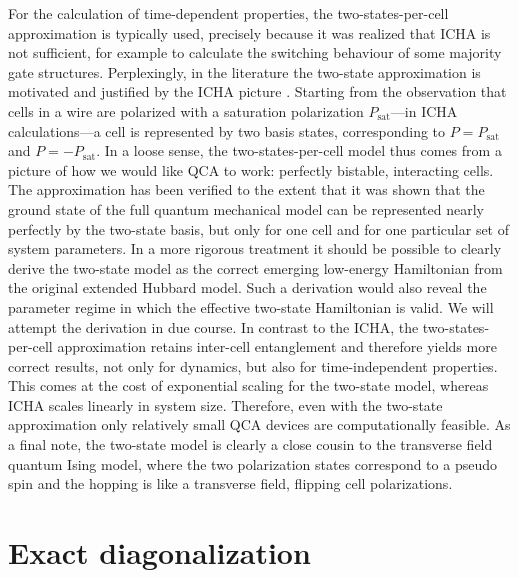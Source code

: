 For the calculation of time-dependent properties, the two-states-per-cell
approximation is typically used, precisely because it was realized that ICHA is
not sufficient, for example to calculate the switching behaviour of some
majority gate structures. Perplexingly, in the literature the two-state
approximation is motivated and justified by the ICHA picture
\cite{tougaw1996dynamic}. Starting from the observation that cells in a wire are
polarized with a saturation polarization $P_{\textrm{sat}}$---in ICHA
calculations---a cell is represented by two basis states, corresponding to $P =
P_{\textrm{sat}}$ and $P = - P_{\textrm{sat}}$. In a loose sense, the
two-states-per-cell model thus comes from a picture of how we would like QCA to
work: perfectly bistable, interacting cells.  The approximation has been
verified to the extent that it was shown that the ground state of the full
quantum mechanical model can be represented nearly perfectly by the two-state
basis, but only for one cell and for one particular set of system parameters. In
a more rigorous treatment it should be possible to clearly derive the two-state
model as the correct emerging low-energy Hamiltonian from the original extended
Hubbard model. Such a derivation would also reveal the parameter regime in which
the effective two-state Hamiltonian is valid. We will attempt the derivation in
due course. In contrast to the ICHA, the two-states-per-cell approximation
retains inter-cell entanglement and therefore yields more correct results, not
only for dynamics, but also for time-independent properties. This comes at the
cost of exponential scaling for the two-state model, whereas ICHA scales
linearly in system size. Therefore, even with the two-state approximation only
relatively small QCA devices are computationally feasible. As a final note, the
two-state model is clearly a close cousin to the transverse field quantum Ising
model, where the two polarization states correspond to a pseudo spin and the
hopping is like a transverse field, flipping cell polarizations.


\section{Exact diagonalization}

